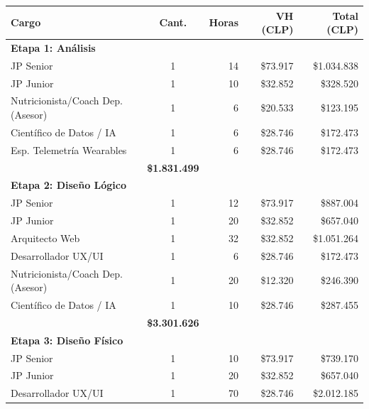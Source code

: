 \documentclass[12pt]{article}
\begin{document}
\begin{table}[h!]
    \centering
    \renewcommand{\arraystretch}{1.15}
    \footnotesize
    \begin{tabular}{|l|c|r|r|r|}
        \hline
        \rowcolor[HTML]{EFEFEF}
        \textbf{Cargo} & \textbf{Cant.} & \textbf{Horas} & \textbf{VH (CLP)} & \textbf{Total (CLP)} \\ \hline
        \multicolumn{5}{|l|}{\cellcolor[HTML]{E3F2FD}\textbf{Etapa 1: Análisis}} \\ \hline
        JP Senior & 1 & 14 & \$73.917 & \$1.034.838 \\ \hline
        JP Junior & 1 & 10 & \$32.852 & \$328.520 \\ \hline
        Nutricionista/Coach Dep. (Asesor) & 1 & 6 & \$20.533 & \$123.195 \\ \hline
        Científico de Datos / IA & 1 & 6 & \$28.746 & \$172.473 \\ \hline
        Esp. Telemetría Wearables & 1 & 6 & \$28.746 & \$172.473 \\ \hline
        \rowcolor[HTML]{F3F3F3}
        \multicolumn{4}{|r|}{\textbf{Subtotal Análisis}} & \textbf{\$1.831.499} \\ \hline
        \multicolumn{5}{|l|}{\cellcolor[HTML]{E3F2FD}\textbf{Etapa 2: Diseño Lógico}} \\ \hline
        JP Senior & 1 & 12 & \$73.917 & \$887.004 \\ \hline
        JP Junior & 1 & 20 & \$32.852 & \$657.040 \\ \hline
        Arquitecto Web & 1 & 32 & \$32.852 & \$1.051.264 \\ \hline
        Desarrollador UX/UI & 1 & 6 & \$28.746 & \$172.473 \\ \hline
        Nutricionista/Coach Dep. (Asesor) & 1 & 20 & \$12.320 & \$246.390 \\ \hline
        Científico de Datos / IA & 1 & 10 & \$28.746 & \$287.455 \\ \hline
        \rowcolor[HTML]{F3F3F3}
        \multicolumn{4}{|r|}{\textbf{Subtotal Diseño Lógico}} & \textbf{\$3.301.626} \\ \hline
        \multicolumn{5}{|l|}{\cellcolor[HTML]{E3F2FD}\textbf{Etapa 3: Diseño Físico}} \\ \hline
        JP Senior & 1 & 10 & \$73.917 & \$739.170 \\ \hline
        JP Junior & 1 & 20 & \$32.852 & \$657.040 \\ \hline
        Desarrollador UX/UI & 1 & 70 & \$28.746 & \$2.012.185 \\ \hline

\end{tabular}
\end{table}
\end{document}
